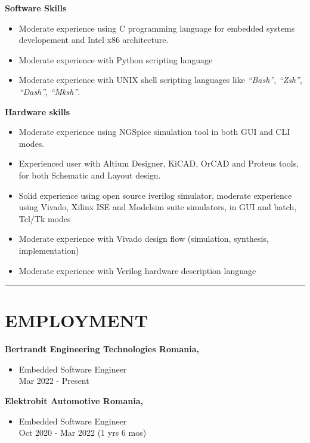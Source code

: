 \documentclass{resume}
\begin{document}
\begin{resume}
   {\bf Software Skills}   
        \begin{itemize}
        \item[] Moderate experience using C programming language for embedded systems developement and
        Intel x86 architecture.
        \item[] Moderate experience with Python scripting language
        \item[] Moderate experience with UNIX shell scripting languages like 
        {\it ``Bash''}, {\it ``Zsh''}, {\it ``Dash''}, {\it ``Mksh''}.
        \end{itemize}

   {\bf Hardware skills}   
        \begin{itemize}
        \item[] Moderate experience using NGSpice simulation tool in both GUI and CLI modes.
        \item[] Experienced user with Altium Designer, KiCAD, OrCAD and Proteus tools,
        for both Schematic and Layout design.
        \item[] Solid experience using open source iverilog simulator, moderate experience using Vivado,
        Xilinx ISE and Modelsim suite simulators, in GUI and batch, Tcl/Tk modes
        \item[] Moderate experience with Vivado design flow (simulation, synthesis, implementation)
        \item[] Moderate experience with Verilog hardware description language
        \end{itemize}

\noindent\rule{\textwidth}{0.4pt}
\section{EMPLOYMENT} 
\vspace{0.1in} 

    {\bf Bertrandt Engineering Technologies Romania,}
    \begin{itemize}
        \item{
            Embedded Software Engineer\\
            Mar 2022 - Present }
    \end{itemize}

    {\bf Elektrobit Automotive Romania,}
    \begin{itemize}
        \item{
            Embedded Software Engineer\\
            Oct 2020 - Mar 2022 (1 yrs 6 mos) }
    \end{itemize}


\end{resume}
\end{document}
